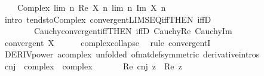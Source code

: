\begin{isabellebody}
\ \ \ \ Complex\ {\isacharparenleft}{\kern0pt}lim\ {\isacharparenleft}{\kern0pt}{\isasymlambda}n{\isachardot}{\kern0pt}\ Re\ {\isacharparenleft}{\kern0pt}X\ n{\isacharparenright}{\kern0pt}{\isacharparenright}{\kern0pt}{\isacharparenright}{\kern0pt}\ {\isacharparenleft}{\kern0pt}lim\ {\isacharparenleft}{\kern0pt}{\isasymlambda}n{\isachardot}{\kern0pt}\ Im\ {\isacharparenleft}{\kern0pt}X\ n{\isacharparenright}{\kern0pt}{\isacharparenright}{\kern0pt}{\isacharparenright}{\kern0pt}{\isachardoublequoteclose}\isanewline
\ \ \ \ \isamarkupfalse%
\ {\isacharparenleft}{\kern0pt}intro\ tendsto{\isacharunderscore}{\kern0pt}Complex\ convergent{\isacharunderscore}{\kern0pt}LIMSEQ{\isacharunderscore}{\kern0pt}iff{\isacharbrackleft}{\kern0pt}THEN\ iffD{}{\isacharbrackright}{\kern0pt}\isanewline
\ \ \ \ \ \ \ \ Cauchy{\isacharunderscore}{\kern0pt}convergent{\isacharunderscore}{\kern0pt}iff{\isacharbrackleft}{\kern0pt}THEN\ iffD{}{\isacharbrackright}{\kern0pt}\ Cauchy{\isacharunderscore}{\kern0pt}Re\ Cauchy{\isacharunderscore}{\kern0pt}Im{\isacharparenright}{\kern0pt}\isanewline
\ \ \isamarkupfalse%
\ \isamarkupfalse%
\ {\isachardoublequoteopen}convergent\ X{\isachardoublequoteclose}\isanewline
\ \ \ \ \isamarkupfalse%
\ complex{\isachardot}{\kern0pt}collapse\ \isamarkupfalse%
\ {\isacharparenleft}{\kern0pt}rule\ convergentI{\isacharparenright}{\kern0pt}\isanewline
{}\isamarkupfalse%
%
\endisatagproof
{\isafoldproof}%
%
\isadelimproof
\isanewline
%
\endisadelimproof
\isanewline
{}\isamarkupfalse%
\ DERIV{\isacharunderscore}{\kern0pt}power{\isacharbrackleft}{\kern0pt}\ {\isacharprime}{\kern0pt}a{\isacharequal}{\kern0pt}complex{\isacharcomma}{\kern0pt}\ unfolded\ of{\isacharunderscore}{\kern0pt}nat{\isacharunderscore}{\kern0pt}def{\isacharbrackleft}{\kern0pt}symmetric{\isacharbrackright}{\kern0pt}{\isacharcomma}{\kern0pt}\ derivative{\isacharunderscore}{\kern0pt}intros{\isacharbrackright}{\kern0pt}%
\isadelimdocument
%
\endisadelimdocument
%
\isatagdocument
%
\isamarkuptrue%
%
\endisatagdocument
{\isafolddocument}%
%
\isadelimdocument
%
\endisadelimdocument
{}\isamarkupfalse%
\ cnj\ {\isacharcolon}{\kern0pt}{\isacharcolon}{\kern0pt}\ {\isachardoublequoteopen}complex\ {\isasymRightarrow}\ complex{\isachardoublequoteclose}\isanewline
\ \ \isanewline
\ \ \ \ {\isachardoublequoteopen}Re\ {\isacharparenleft}{\kern0pt}cnj\ z{\isacharparenright}{\kern0pt}\ {\isacharequal}{\kern0pt}\ Re\ z{\isachardoublequoteclose}\isanewline

\end{isabellebody}
